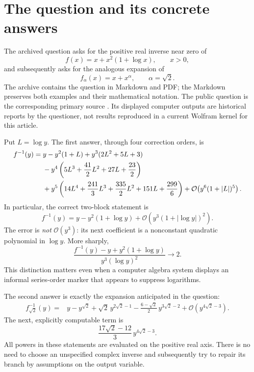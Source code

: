 \documentclass[11pt,a4paper]{article}
\numberwithin{equation}{section}
\theoremstyle{definition}
\newcommand{\OO}{\mathcal O}
\begin{document}
\section{The question and its concrete answers}\label{sec:answers}

The archived question asks for the positive real inverse near zero of
\begin{equation}\label{eq:question1}
 f(x)=x+x^2(1+\log x),\qquad x>0,
\end{equation}
and subsequently asks for the analogous expansion of
\begin{equation}\label{eq:question2}
 f_\alpha(x)=x+x^\alpha,\qquad \alpha=\sqrt2.
\end{equation}
The archive contains the question in Markdown and PDF; the Markdown
preserves both examples and their mathematical notation. The public
question is the corresponding primary source \cite{question}.
Its displayed computer outputs are historical reports by the questioner,
not results reproduced in a current Wolfram kernel for this article.

Put $L=\log y$. The first answer, through four correction orders, is
\begin{align}
 f^{-1}(y)={}&y-y^2(1+L)+y^3(2L^2+5L+3)\notag\\
 &-y^4\left(5L^3+\frac{41}{2}L^2+27L+\frac{23}{2}\right)\notag\\
 &+y^5\left(14L^4+\frac{241}{3}L^3+\frac{335}{2}L^2
                 +151L+\frac{299}{6}\right)
 +\OO\!\left(y^6(1+|L|)^5\right).
 \label{eq:log-answer}
\end{align}
In particular, the correct two-block statement is
\begin{equation}\label{eq:two-block}
 f^{-1}(y)=y-y^2(1+\log y)
          +\OO\!\left(y^3(1+|\log y|)^2\right).
\end{equation}
The error is \emph{not} $\OO(y^3)$: its next coefficient is a
nonconstant quadratic polynomial in $\log y$. More sharply,
\[
 \frac{f^{-1}(y)-y+y^2(1+\log y)}{y^3(\log y)^2}\longrightarrow2.
\]
This distinction matters even when a computer algebra system displays an
informal series-order marker that appears to suppress logarithms.

The second answer is exactly the expansion anticipated in the question:
\begin{align}
 f_{\sqrt2}^{-1}(y)={}&y-y^{\sqrt2}
       +\sqrt2\,y^{2\sqrt2-1}
       -\frac{6-\sqrt2}{2}\,y^{3\sqrt2-2}
       +\OO\!\left(y^{4\sqrt2-3}\right).
 \label{eq:irr-answer}
\end{align}
The next, explicitly computable term is
\[
 \frac{17\sqrt2-12}{3}\,y^{4\sqrt2-3}.
\]
All powers in these statements are evaluated on the positive real axis.
There is no need to choose an unspecified complex inverse and subsequently
try to repair its branch by assumptions on the output variable.
\end{document}
